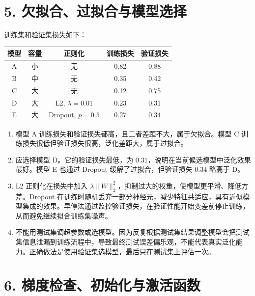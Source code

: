 \documentclass[UTF8,zihao=-4]{ctexart}
\begin{document}
\section*{5. 欠拟合、过拟合与模型选择}

训练集和验证集损失如下：

\begin{center}
\begin{tabular}{c c c c c}
\toprule
模型 & 容量 & 正则化 & 训练损失 & 验证损失 \\
\midrule
A & 小 & 无 & 0.82 & 0.88 \\
B & 中 & 无 & 0.35 & 0.42 \\
C & 大 & 无 & 0.12 & 0.75 \\
D & 大 & L2, $\lambda=0.01$ & 0.23 & 0.31 \\
E & 大 & Dropout, $p=0.5$ & 0.27 & 0.34 \\
\bottomrule
\end{tabular}
\end{center}

\begin{enumerate}[label=(\arabic*)]
\item 模型 A 训练损失和验证损失都高，且二者差距不大，属于欠拟合。模型 C 训练损失很低但验证损失很高，泛化差距大，属于过拟合。

\item 应选择模型 D。它的验证损失最低，为 $0.31$，说明在当前候选模型中泛化效果最好。模型 E 也通过 Dropout 缓解了过拟合，但验证损失 $0.34$ 略高于 D。

\item L2 正则化在损失中加入 $\lambda\lVert W\rVert_2^2$，抑制过大的权重，使模型更平滑、降低方差。Dropout 在训练时随机丢弃一部分神经元，减少特征共适应，具有近似模型集成的效果。早停法通过监控验证损失，在验证性能开始变差前停止训练，从而避免继续拟合训练集噪声。

\item 不能用测试集调超参数或选模型。因为反复根据测试集结果调整模型会把测试集信息泄漏到训练流程中，导致最终测试误差偏乐观，不能代表真实泛化能力。正确做法是使用验证集选模型，最后只在测试集上评估一次。
\end{enumerate}

\section*{6. 梯度检查、初始化与激活函数}
\end{document}
